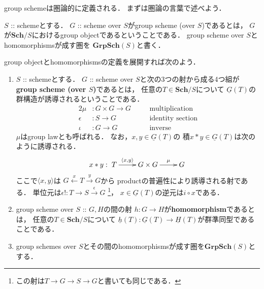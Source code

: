 \documentclass[a4paper]{jsarticle}
\newcommand{\Sch}{\mathbf{Sch}}
\newcommand{\GrpSch}{\mathbf{GrpSch}}
\newcommand{\func}[1]{\underline{#1}}
\begin{document}
    group schemeは圏論的に定義される．
    まずは圏論の言葉で述べよう．
    \begin{Def}
        $S$ :: schemeとする．
        $G$ :: scheme over $S$がgroup scheme (over $S$)であるとは，
        $G$が$\Sch/S$におけるgroup objectであるということである．
        group scheme over $S$とhomomorphismsが成す圏を
        $\GrpSch(S)$と書く．
    \end{Def}
    group objectとhomomorphismsの定義を展開すれば次のよう．
    \begin{Def}
    \enumfix
    \begin{enumerate}[label=(\roman*),leftmargin=*]
        \item
        $S$ :: schemeとする．
        $G$ :: scheme over $S$と次の3つの射から成る4つ組が
        \textbf{group scheme (over $S$)}であるとは，
        任意の$T \in \Sch/S$について
        $\func{G}(T)$の群構造が誘導されるということである．
        \begin{alignat*}{2}
            \mu&:       G \times G \to G    && \quad \text{multiplication} \\
            \epsilon&:  S \to G             && \quad \text{identity section}\\
            \iota&:     G \to G             && \quad \text{inverse}
        \end{alignat*}
        $\mu$はgroup lawとも呼ばれる．
        なお，$x, y \in \func{G}(T)$の
        積$x \ast y \in \func{G}(T)$は次のように誘導される．
        \[
            x \ast y:
        \xymatrix
        {
            T \ar[r]^-{\langle x, y \rangle}& G \times G \ar[r]^-{\mu}& G
        }
        \]
        ここで$\langle x, y \rangle$は
        $G \xleftarrow{x} T \xrightarrow{y} G$から
        productの普遍性により誘導される射である．
        単位元は$\epsilon!: T \to S \xrightarrow{\epsilon} G$
        \footnote{ この射は$T \to G \to S \to G$と書いても同じである． }，
        $x \in \func{G}(T)$の逆元は$i \circ x$である．

        \item
        group scheme over $S$ :: $G,H$の間の射
        $h: G \to H$が\textbf{homomorphism}であるとは，
        任意の$T \in \Sch/S$について
        $\func{h}(T):\func{G}(T) \to \func{H}(T)$が群準同型であることである．

        \item 
            group schemes over $S$とその間のhomomorphismsが成す圏を\textbf{$\GrpSch(S)$}とする．
    \end{enumerate}
    \end{Def}
\end{document}
